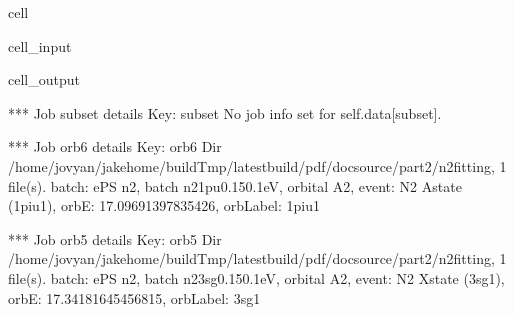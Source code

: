 \documentclass[letterpaper,table,10pt,english]{jupyterBook}
\begin{document}
\begin{sphinxuseclass}{cell}\begin{sphinxVerbatimInput}

\begin{sphinxuseclass}{cell_input}
\begin{sphinxVerbatim}[commandchars=\\\{\}]

   

       

\end{sphinxVerbatim}

\end{sphinxuseclass}\end{sphinxVerbatimInput}
\begin{sphinxVerbatimOutput}

\begin{sphinxuseclass}{cell_output}
\begin{sphinxVerbatim}[commandchars=\\\{\}]
*** Job subset details
Key: subset
No \PYGZsq{}job\PYGZsq{} info set for self.data[subset].

*** Job orb6 details
Key: orb6
Dir /home/jovyan/jake\PYGZhy{}home/buildTmp/\PYGZus{}latest\PYGZus{}build/pdf/doc\PYGZhy{}source/part2/n2fitting, 1 file(s).
\PYGZob{}   \PYGZsq{}batch\PYGZsq{}: \PYGZsq{}ePS n2, batch n2\PYGZus{}1pu\PYGZus{}0.1\PYGZhy{}50.1eV, orbital A2\PYGZsq{},
    \PYGZsq{}event\PYGZsq{}: \PYGZsq{} N2 A\PYGZhy{}state (1piu\PYGZhy{}1)\PYGZsq{},
    \PYGZsq{}orbE\PYGZsq{}: \PYGZhy{}17.09691397835426,
    \PYGZsq{}orbLabel\PYGZsq{}: \PYGZsq{}1piu\PYGZhy{}1\PYGZsq{}\PYGZcb{}

*** Job orb5 details
Key: orb5
Dir /home/jovyan/jake\PYGZhy{}home/buildTmp/\PYGZus{}latest\PYGZus{}build/pdf/doc\PYGZhy{}source/part2/n2fitting, 1 file(s).
\PYGZob{}   \PYGZsq{}batch\PYGZsq{}: \PYGZsq{}ePS n2, batch n2\PYGZus{}3sg\PYGZus{}0.1\PYGZhy{}50.1eV, orbital A2\PYGZsq{},
    \PYGZsq{}event\PYGZsq{}: \PYGZsq{} N2 X\PYGZhy{}state (3sg\PYGZhy{}1)\PYGZsq{},
    \PYGZsq{}orbE\PYGZsq{}: \PYGZhy{}17.34181645456815,
    \PYGZsq{}orbLabel\PYGZsq{}: \PYGZsq{}3sg\PYGZhy{}1\PYGZsq{}\PYGZcb{}
\end{sphinxVerbatim}

\end{sphinxuseclass}\end{sphinxVerbatimOutput}

\end{sphinxuseclass}
\end{document}
